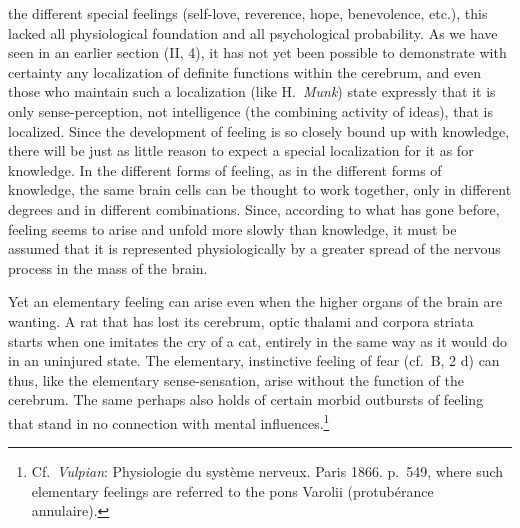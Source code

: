 \documentclass[12pt,a4paper]{book}
\newcommand{\opage}[1]{\marginnote{\footnotesize\textit{[#1]}}}
\begin{document}
the different special feelings (self-love, reverence, hope, benevolence,
etc.), this lacked all physiological foundation and all psychological
probability. As we have seen in an earlier section (II, 4), it has not
yet been possible to demonstrate with certainty any localization of
definite functions within the cerebrum, and even those who maintain such
a localization (like H.~\emph{Munk}) state expressly that it is only
sense-perception, not intelligence (the combining activity of ideas),
that is localized. Since the development of feeling is so closely bound
up with knowledge, there will be just as little reason to expect a
special localization for it as for knowledge. In the different forms of
feeling, as in the different forms of knowledge, the same brain cells
can be thought to work together, only in different degrees and in
different combinations. Since, according to what has gone before,
feeling seems to arise and unfold more slowly than knowledge, it must be
assumed that it is represented physiologically by a greater spread of
the nervous process in the mass of the brain.

Yet an elementary feeling can arise even when the higher organs of the
brain are wanting. A rat that has lost its
\opage{320}cerebrum, optic thalami and corpora striata starts when one
imitates the cry of a cat, entirely in the same way as it would do in
an uninjured state. The elementary, instinctive feeling of fear (cf.\ B,
2 d) can thus, like the elementary sense-sensation, arise without the
function of the cerebrum. The same perhaps also holds of certain morbid
outbursts of feeling that stand in no connection with mental
influences.\footnote{Cf.\ \emph{Vulpian}: Physiologie du système
nerveux. Paris 1866. p.~549, where such elementary feelings are referred
to the pons Varolii (protubérance annulaire).}
\end{document}
